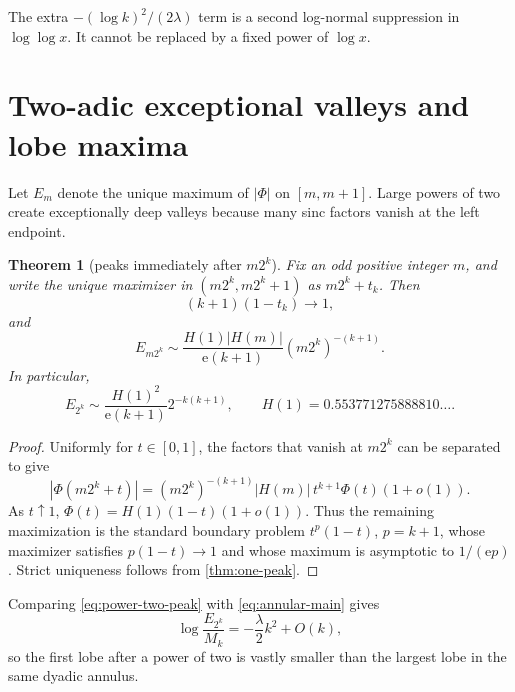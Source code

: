 \documentclass[11pt,oneside]{article}
\newtheorem{theorem}{Theorem}[section]
\theoremstyle{definition}
\theoremstyle{remark}
\newcommand{\e}{\mathrm e}
\begin{document}
The extra \(- (\log k)^2/(2\lambda)\) term is a second log-normal suppression
in \(\log\log x\).  It cannot be replaced by a fixed power of \(\log x\).

\section{Two-adic exceptional valleys and lobe maxima}
\label{sec:two-adic}

Let \(E_m\) denote the unique maximum of \(|\Phi|\) on \([m,m+1]\).  Large
powers of two create exceptionally deep valleys because many sinc factors
vanish at the left endpoint.

\begin{theorem}[peaks immediately after \(m2^k\)]
\label{thm:two-adic-peaks}
Fix an odd positive integer \(m\), and write the unique maximizer in
\((m2^k,m2^k+1)\) as \(m2^k+t_k\).  Then
\begin{equation}
 (k+1)(1-t_k)\longrightarrow1,
 \label{eq:peak-location}
\end{equation}
and
\begin{equation}
 \boxed{
 E_{m2^k}\sim
 \frac{H(1)|H(m)|}{\e(k+1)}(m2^k)^{-(k+1)}.}
 \label{eq:two-adic-peak}
\end{equation}
In particular,
\begin{equation}
 E_{2^k}\sim\frac{H(1)^2}{\e(k+1)}2^{-k(k+1)},
 \qquad H(1)=0.553771275888810\ldots .
 \label{eq:power-two-peak}
\end{equation}
\end{theorem}

\begin{proof}
Uniformly for \(t\in[0,1]\), the factors that vanish at \(m2^k\) can be
separated to give
\begin{equation}
 |\Phi(m2^k+t)|
 =(m2^k)^{-(k+1)}|H(m)|\,t^{k+1}\Phi(t)(1+o(1)).
 \label{eq:near-two-adic-factor}
\end{equation}
As \(t\uparrow1\),
\(\Phi(t)=H(1)(1-t)(1+o(1))\).  Thus the remaining maximization is the
standard boundary problem
\(t^p(1-t)\), \(p=k+1\), whose maximizer satisfies
\(p(1-t)\to1\) and whose maximum is asymptotic to \(1/(\e p)\).
Strict uniqueness follows from \cref{thm:one-peak}.
\end{proof}

Comparing \eqref{eq:power-two-peak} with \eqref{eq:annular-main} gives
\[
 \log\frac{E_{2^k}}{M_k}=-\frac\lambda2k^2+O(k),
\]
so the first lobe after a power of two is vastly smaller than the largest lobe
in the same dyadic annulus.
\end{document}

